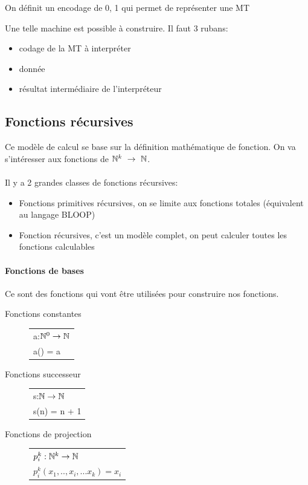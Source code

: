 \begin{myrem}
	On définit un encodage de 0, 1 qui permet de représenter une MT
\end{myrem}

Une telle machine est possible à construire. Il faut 3 rubans:
\begin{itemize}
	\item codage de la MT à interpréter
	\item donnée
	\item résultat intermédiaire de l'interpréteur
\end{itemize}

\subsection{Fonctions récursives}
\label{sub:fonction_r_cursives}
Ce modèle de calcul se base sur la définition mathématique de fonction. On va 
s'intéresser aux fonctions de $\mathbb{N}^k \ \rightarrow \ \mathbb{N}$.

\paragraph{} Il y a 2 grandes classes de fonctions récursives: 
\begin{itemize}
	\item Fonctions primitives récursives, on se limite aux fonctions totales 
		(équivalent au langage BLOOP)
	\item Fonction récursives, c'est un modèle complet, on peut calculer 
		toutes les fonctions calculables 
\end{itemize}

\paragraph{Fonctions de bases} Ce sont des fonctions qui vont être utilisées 
pour construire nos fonctions.

\begin{description}
	\item[Fonctions constantes] 
		\begin{tabular}{|l|}
			\hline
			a:$\mathbb{N}^0 \rightarrow \mathbb{N}$\\
			a() = a\\
			\hline
		\end{tabular}
	\item[Fonctions successeur] 
		\begin{tabular}{|l|}
			\hline
			s:$\mathbb{N} \rightarrow \mathbb{N}$\\
			s(n) = n + 1\\
			\hline
		\end{tabular}
	\item[Fonctions de projection] 
		\begin{tabular}{|l|}
			\hline
			$p^k_i: \mathbb{N}^k \rightarrow \mathbb{N}$\\
			$p^k_i(x_1,..,x_i,...x_k) = x_i$\\
			\hline
		\end{tabular}
\end{description}

